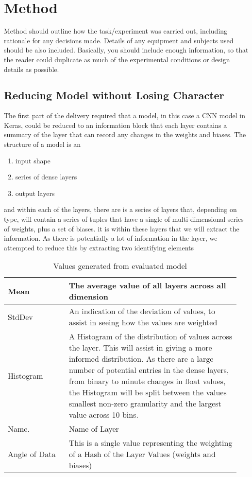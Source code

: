 \section{Method}
Method should outline how the task/experiment was carried out, including rationale for any decisions made. Details of any equipment and subjects used should be also included. Basically, you should include enough information, so that the reader could duplicate as much of the experimental conditions or design details as possible.

\subsection{Reducing Model without Losing Character}
The first part of the delivery required that a model, in this case a CNN model in Keras, could be reduced to an information block that each layer contains a summary of the layer that can record any changes in the weights and biases. The structure of a model is an 
\begin{enumerate}
\item input shape
\item series of dense layers
\item output layers
\end{enumerate}

and within each of the layers, there are is a series of layers that, depending on type, will contain a series of tuples that have a single of multi-dimensional series of weights, plus a set of biases. it is within these layers that we will extract the information. As there is potentially a lot of information in the layer, we attempted to reduce this by extracting two identifying elements

\begin{table}[h]
    \caption{Values generated from evaluated model}
    \setlength\tabcolsep{0pt} %
    \begin{tabular} { p{0.25\linewidth}  p{0.7\linewidth} }
        Mean    & The average value of all layers across all dimension \\ \hline 
        StdDev  & An indication of the deviation of values, to assist in seeing how the values are weighted \\ \hline
        Histogram & A Histogram of the distribution of values across the layer. This will assist in giving a more informed distribution. As there are a large number of potential entries in the dense layers, from binary to minute changes in float values, the Histogram will be split between the values smallest non-zero granularity and the largest value across 10 bins. \\ \hline
        Name.   & Name of Layer \\ \hline
        Angle of Data & This is a single value representing the weighting of a Hash of the Layer Values (weights and biases) \\ 
    \end{tabular}
\end{table}

